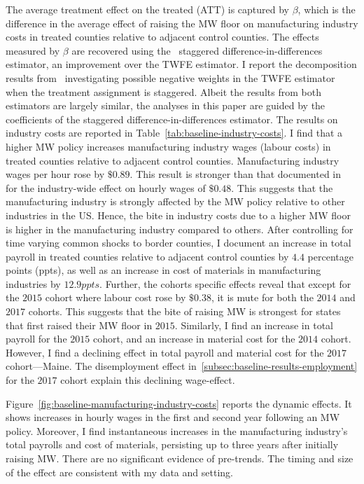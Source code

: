\documentclass[12pt, english]{article}
\begin{document}
    The average treatment effect on the treated (ATT) is captured by $\beta$, which is the difference in the average effect of raising the MW floor on manufacturing industry costs in treated counties relative to adjacent control counties. The effects measured by $\beta$ are recovered using the~\cite{sun2021estimating} staggered difference-in-differences estimator, an improvement over the TWFE estimator. I report the decomposition results from~\cite{de2020two} investigating possible negative weights in the TWFE estimator when the treatment assignment is staggered. Albeit the results from both estimators are largely similar, the analyses in this paper are guided by the coefficients of the staggered difference-in-differences estimator. The results on industry costs are reported in Table~\ref{tab:baseline-industry-costs}. I find that a higher MW policy increases manufacturing industry wages (labour costs) in treated counties relative to adjacent control counties. Manufacturing industry wages per hour rose by $\$0.89$. This result is stronger than that documented in~\cite{gopalan2021state} for the industry-wide effect on hourly wages of $\$0.48$. This suggests that the manufacturing industry is strongly affected by the MW policy relative to other industries in the US. Hence, the bite in industry costs due to a higher MW floor is higher in the manufacturing industry compared to others. After controlling for time varying common shocks to border counties, I document an increase in total payroll in treated counties relative to adjacent control counties by $4.4$ percentage points (ppts), as well as an increase in cost of materials in manufacturing industries by $12.9ppts$. Further, the cohorts specific effects reveal that except for the $2015$ cohort where labour cost rose by $\$0.38$, it is mute for both the $2014$ and $2017$ cohorts. This suggests that the bite of raising MW is strongest for states that first raised their MW floor in $2015$. Similarly, I find an increase in total payroll for the $2015$ cohort, and an increase in material cost for the $2014$ cohort. However, I find a declining effect in total payroll and material cost for the $2017$ cohort---Maine. The disemployment effect in~\ref{subsec:baseline-results-employment} for the $2017$ cohort explain this declining wage-effect.
    

    Figure~\ref{fig:baseline-manufacturing-industry-costs} reports the dynamic effects. It shows increases in hourly wages in the first and second year following an MW policy. Moreover, I find instantaneous increases in the manufacturing industry's total payrolls and cost of materials, persisting up to three years after initially raising MW. There are no significant evidence of pre-trends. The timing and size of the effect are consistent with my data and setting.
\end{document}

